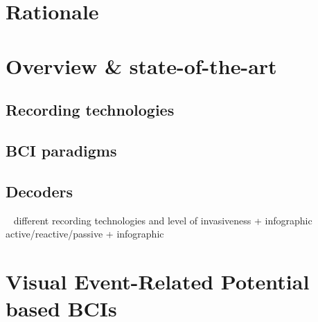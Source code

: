 \section{Rationale}
\section{Overview \& state-of-the-art}
\subsection{Recording technologies}
\subsection{BCI paradigms}
\subsection{Decoders}
~\cite{Review of classification techniques}
different recording technologies and level of invasiveness + infographic
active/reactive/passive + infographic
\section{Visual Event-Related Potential based BCIs}

